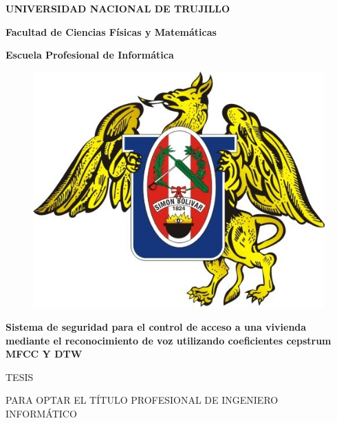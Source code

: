 \textheight 19cm
\pagestyle{empty}
\begin{center}
 {\bf {\fontsize{14}{16.8}\selectfont UNIVERSIDAD NACIONAL DE TRUJILLO}}     
 
    {\bf{\fontsize{14}{16.8}\selectfont Facultad de Ciencias Físicas y Matemáticas}} 

  {\bf{\fontsize{14}{16.8}\selectfont Escuela Profesional de Informática}}
\end{center}  

\begin{figure}[ht]
\begin{center}
\includegraphics[width=.4\textwidth]{Imagenes/Cap0/unt}
\end{center}
\end{figure}
\vskip 0.5cm

\begin{center}  
    {\bf\Large{{\fontsize{17}{20.4}\selectfont{} Sistema de seguridad para el control de acceso a una vivienda mediante el reconocimiento de voz utilizando coeficientes cepstrum MFCC Y DTW}}}
\end{center}   

\begin{center}
{\Large{TESIS}}
\end{center}
\begin{center}
{\large{\hspace*{0.4cm} PARA OPTAR EL TÍTULO PROFESIONAL DE INGENIERO  INFORMÁTICO}}
\end{center}

\vskip 0.6cm
\begin{center}
  { \fontsize{14}{16.8}} \\
    { \fontsize{14}{16.8}}\\
    \vskip 0.2cm
    { \fontsize{14}{16.8}}
\end{center}  

